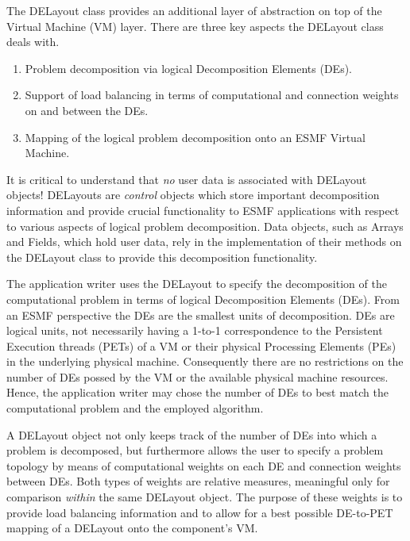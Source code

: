 
The DELayout class provides an additional layer of abstraction on top of the Virtual Machine (VM) layer. There are three key aspects the DELayout class deals with.

\begin{enumerate}

\item Problem decomposition via logical Decomposition Elements (DEs).

\item Support of load balancing in terms of computational and connection weights on and between the DEs. 

\item Mapping of the logical problem decomposition onto an ESMF Virtual Machine.

\end{enumerate}

It is critical to understand that {\it no} user data is associated with DELayout objects! DELayouts are {\it control} objects which store important decomposition information and provide crucial functionality to ESMF applications with respect to various aspects of logical problem decomposition. Data objects, such as Arrays and Fields, which hold user data, rely in the implementation of their methods on the DELayout class to provide this decomposition functionality.

The application writer uses the DELayout to specify the decomposition of the computational problem in terms of logical Decomposition Elements (DEs). From an ESMF perspective the DEs are the smallest units of decomposition. DEs are logical units, not necessarily having a 1-to-1 correspondence to the Persistent Execution threads (PETs) of a VM or their physical Processing Elements (PEs) in the underlying physical machine. Consequently there are no restrictions on the number of DEs possed by the VM or the available physical machine resources. Hence, the application writer may chose the number of DEs to best match the computational problem and the employed algorithm.

A DELayout object not only keeps track of the number of DEs into which a problem is decomposed, but furthermore allows the user to specify a problem topology by means of computational weights on each DE and connection weights between DEs. Both types of weights are relative measures, meaningful only for comparison {\it within} the same DELayout object. The purpose of these weights is to provide load balancing information and to allow for a best possible DE-to-PET mapping of a DELayout onto the component's VM.

